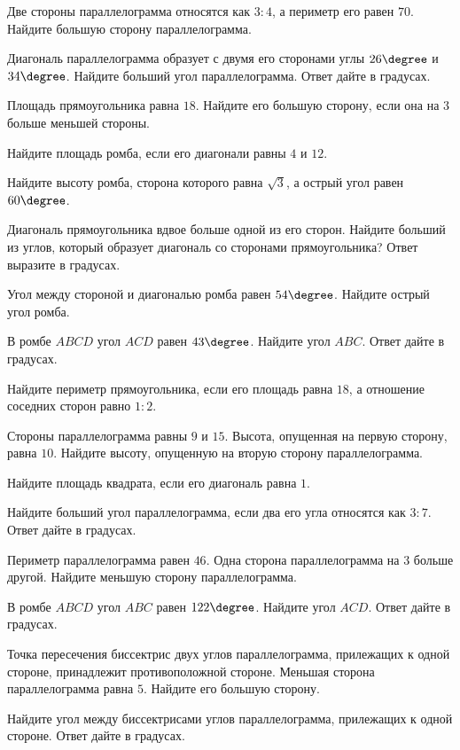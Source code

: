 \begin{class}[number=5-6]
\begin{listofex}
		\item Две стороны параллелограмма относятся как \( 3:4 \), а периметр его равен \( 70 \). Найдите большую сторону параллелограмма.
		\item Диагональ параллелограмма образует с двумя его сторонами углы \( 26\degree \) и \( 34\degree \). Найдите больший угол параллелограмма. Ответ дайте в градусах.
		\item Площадь прямоугольника равна \( 18 \). Найдите его большую сторону, если она на \( 3 \) больше меньшей стороны.
		\item Найдите площадь ромба, если его диагонали равны \( 4 \) и \( 12 \).		
		\item Найдите высоту ромба, сторона которого равна \( \sqrt{3} \), а острый угол равен \( 60\degree \).
		\item Диагональ прямоугольника вдвое больше одной из его сторон. Найдите больший из углов, который образует диагональ со сторонами прямоугольника? Ответ выразите в градусах.
		\item Угол между стороной и диагональю ромба равен \( 54\degree \). Найдите острый угол ромба.
		\item В ромбе \( ABCD \) угол \( ACD \) равен \( 43\degree \). Найдите угол \( ABC \). Ответ дайте в градусах.
		\item Найдите периметр прямоугольника, если его площадь равна \( 18 \), а отношение соседних сторон равно \( 1:2 \).
		\item Стороны параллелограмма равны \( 9 \) и \( 15 \). Высота, опущенная на первую сторону, равна \( 10 \). Найдите высоту, опущенную на вторую сторону параллелограмма.
		\item Найдите площадь квадрата, если его диагональ равна \( 1 \).
		\item Найдите больший угол параллелограмма, если два его угла относятся как \( 3:7 \). Ответ дайте в градусах.
		\item Периметр параллелограмма равен \( 46 \). Одна сторона параллелограмма на \( 3 \) больше другой. Найдите меньшую сторону параллелограмма.
		\item В ромбе \( ABCD \) угол \( ABC \) равен \( 122\degree \). Найдите угол \( ACD \). Ответ дайте в градусах.
		\item Точка пересечения биссектрис двух углов параллелограмма, прилежащих к одной стороне, принадлежит противоположной стороне. Меньшая сторона параллелограмма равна \( 5 \). Найдите его большую сторону.
		\item Найдите угол между биссектрисами углов параллелограмма, прилежащих к одной стороне. Ответ дайте в градусах.

\end{listofex}
\end{class}
